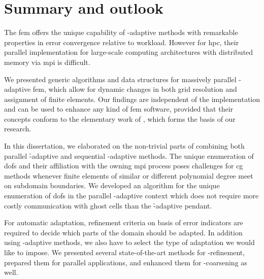 \chapter{Summary and outlook}
\label{ch:summary}
\glsresetall


The \gls{fem} offers the unique capability of \hp-adaptive methods with remarkable properties in error convergence relative to workload. However for \gls{hpc}, their parallel implementation for large-scale computing architectures with distributed memory via \gls{mpi} is difficult.

We presented generic algorithms and data structures for massively parallel \hp-adaptive \gls{fem}, which allow for dynamic changes in both grid resolution and assignment of finite elements. Our findings are independent of the implementation and can be used to enhance any kind of \gls{fem} software, provided that their concepts conform to the elementary work of \textcite{bangerth2009,bangerth2012}, which forms the basis of our research.




In this dissertation, we elaborated on the non-trivial parts of combining both parallel \h-adaptive and sequential \hp-adaptive methods.
The unique enumeration of \glspl{dof} and their affiliation with the owning \gls{mpi} process poses challenges for \gls{cg} methods whenever finite elements of similar or different polynomial degree meet on subdomain boundaries. We developed an algorithm for the unique enumeration of \glspl{dof} in the parallel \hp-adaptive context which does not require more costly communication with ghost cells than the \h-adaptive pendant.

For automatic adaptation, refinement criteria on basis of error indicators are required to decide which parts of the domain should be adapted. In addition using \hp-adaptive methods, we also have to select the type of adaptation we would like to impose.
We presented several state-of-the-art methods for \hp-refinement, prepared them for parallel applications, and enhanced them for \hp-coarsening as well.

